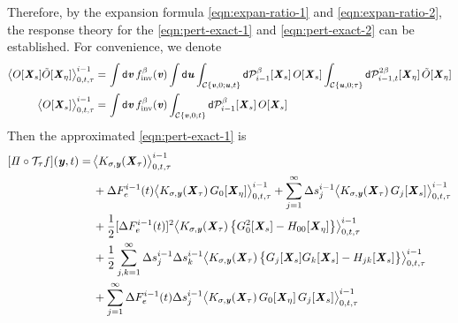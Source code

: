 \documentclass[aip,jcp,a4paper,reprint,onecolumn]{revtex4-1}
\newcommand{\vect}[1]{\textbf{\textit{#1}}}
\newcommand{\dd}{\textsf{d}}
\newcommand{\inv}{\textrm{inv}}
\newcommand{\mt}{\mathcal T}
\newcommand{\mc}{\mathcal C}
\newcommand{\proj}{\mathit\Pi}
\begin{document}
Therefore, by the expansion formula \eqref{eqn:expan-ratio-1} and
\eqref{eqn:expan-ratio-2}, the response theory for the
\eqref{eqn:pert-exact-1} and \eqref{eqn:pert-exact-2} can be
established.
For convenience, we denote
\begin{align}
  \big\langle
  O[\vect X_s]\tilde O[\vect X_\eta]
  \big\rangle_{0,t,\tau}^{i-1}
  =&\,
  \int\dd\vect v\,
  f_\inv^\beta(\vect v)
  \int\dd\vect u
  \int_{\mc\{\vect v, 0; \vect u, t\}}
  \dd\mathcal P^\beta_{i-1}[\vect X_s]
  \,
  O[\vect X_s]
  \int_{\mc\{\vect u, 0; \tau\}}
  \dd\mathcal P^{2\beta}_{i-1,t}[\vect X_\eta]
  \,
  \tilde O[\vect X_\eta]
  \\
  \big\langle
  O[\vect X_s]
  \big\rangle_{0,t,\tau}^{i-1}
  = &\,
  \int\dd\vect v\,
  f_\inv^\beta(\vect v)
  \int_{\mc\{\vect v, 0; t\}}
  \dd\mathcal P^\beta_{i-1}[\vect X_s]
  \,
  O[\vect X_s]  
\end{align}
Then the approximated \eqref{eqn:pert-exact-1} is
\begin{align}\nonumber
  [\proj\circ\mt_\tau f](\vect y, t)
  =&\,
  \big\langle
  K_{\sigma,\vect y}(\vect X_\tau)
  \big\rangle_{0,t,\tau}^{i-1}
  \\ \nonumber
  &\, +
  \Delta F_e^{i-1}(t) 
  \big\langle
  K_{\sigma,\vect y}(\vect X_\tau)\,
  G_0[\vect X_\eta]
  \big\rangle_{0,t,\tau}^{i-1}
  +
  \sum_{j=1}^\infty
  \Delta s_j^{i-1}
  \big\langle
  K_{\sigma,\vect y}(\vect X_\tau)\,
  G_j[\vect X_s]
  \big\rangle_{0,t,\tau}^{i-1}
  \\\nonumber
  &\, 
  +
  \frac12[\Delta F_e^{i-1}(t)]^2
  \big\langle
  K_{\sigma,\vect y}(\vect X_\tau)\,
  \big\{
  G^2_0[\vect X_s] - 
  H_{00}[\vect X_\eta]
  \big\}
  \big\rangle_{0,t,\tau}^{i-1}
  \\\nonumber
  &\,
  +
  \frac 12
  \sum_{j,k=1}^\infty
  \Delta s_j^{i-1}\Delta s_k^{i-1}
  \big\langle
  K_{\sigma,\vect y}(\vect X_\tau)\,
  \big\{
  G_j[\vect X_s] G_k[\vect X_s] - 
  H_{jk}[\vect X_s]
  \big\}
  \big\rangle_{0,t,\tau}^{i-1}
  \\\label{eqn:pert-approx-1}
  &\,+
  \sum_{j=1}^\infty
  \Delta F_e^{i-1}(t) \Delta s_j^{i-1}
  \big\langle
  K_{\sigma,\vect y}(\vect X_\tau)\,
  G_0[\vect X_\eta]\,
  G_j[\vect X_s]
  \big\rangle_{0,t,\tau}^{i-1}
\end{align}
\end{document}
